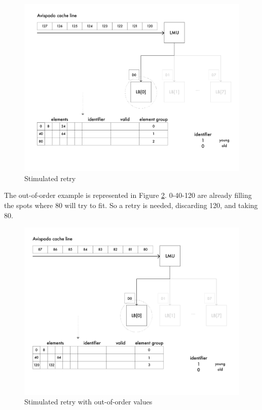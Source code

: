 \begin{figure}[H]
    \centering
    \includegraphics[scale = 0.6]{Chapter_2/img/cache-to-lb-ret-ex.png}
    \caption{Stimulated retry}
    \label{cache-to-lb-ret-ex}
\end{figure}


The out-of-order example is represented in Figure \ref{cache-to-lb-ooo-ret-ex}. 0-40-120 are already filling the spots where 80 will try to fit. So a retry is needed, discarding 120, and taking 80.

\begin{figure}[H]
    \centering
    \includegraphics[scale = 0.6]{Chapter_2/img/cache-to-lb-ooo-ret-ex.png}
    \caption{Stimulated retry with out-of-order values}
    \label{cache-to-lb-ooo-ret-ex}
\end{figure}



